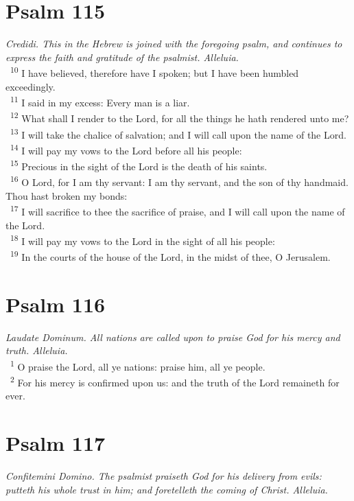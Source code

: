 \documentclass[a5paper,12pt]{article}
\begin{document}
\begin{multicols*}{2}
\section{Psalm 115}
\label{sec:org48bef5e}
\emph{Credidi. This in the Hebrew is joined with the foregoing psalm, and continues to express the faith and gratitude of the psalmist. Alleluia.}\\

~\textsuperscript{10} I have believed, therefore have I spoken; but I have been humbled exceedingly.\\
~\textsuperscript{11} I said in my excess: Every man is a liar.\\
~\textsuperscript{12} What shall I render to the Lord, for all the things he hath rendered unto me?\\
~\textsuperscript{13} I will take the chalice of salvation; and I will call upon the name of the Lord.\\
~\textsuperscript{14} I will pay my vows to the Lord before all his people:\\
~\textsuperscript{15} Precious in the sight of the Lord is the death of his saints.\\
~\textsuperscript{16} O Lord, for I am thy servant: I am thy servant, and the son of thy handmaid. Thou hast broken my bonds:\\
~\textsuperscript{17} I will sacrifice to thee the sacrifice of praise, and I will call upon the name of the Lord.\\
~\textsuperscript{18} I will pay my vows to the Lord in the sight of all his people:\\
~\textsuperscript{19} In the courts of the house of the Lord, in the midst of thee, O Jerusalem.\\

\section{Psalm 116}
\label{sec:org8f26d63}
\emph{Laudate Dominum. All nations are called upon to praise God for his mercy and truth. Alleluia.}\\

~\textsuperscript{1} O praise the Lord, all ye nations: praise him, all ye people.\\
~\textsuperscript{2} For his mercy is confirmed upon us: and the truth of the Lord remaineth for ever.\\

\section{Psalm 117}
\label{sec:org09f2f4f}
\emph{Confitemini Domino. The psalmist praiseth God for his delivery from evils: putteth his whole trust in him; and foretelleth the coming of Christ. Alleluia.}\\


\end{multicols*}
\end{document}
